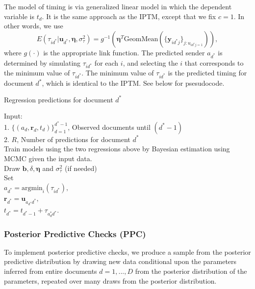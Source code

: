 \documentclass[twoside]{article}
\begin{document}
     The model of timing is via generalized linear model in which the dependent variable is $t_{d}$. It is the same approach as the IPTM, except that we fix $c=1$. In other words, we use
     \begin{equation*}
     E(\tau_{id^*}|\boldsymbol{u}_{d^*}, \boldsymbol{\eta}, \sigma_\tau^2) = g^{-1}(\boldsymbol{\eta}^T\mbox{GeomMean}(\{\boldsymbol{y}_{id^*j}\}_{j:u_{id^*j = 1}})),
     \label{eqn:predtime}
     \end{equation*}
     where $g(\cdot)$ is the appropriate link function. The predicted sender $a_{d^*}$ is determined by simulating $\tau_{id^*}$ for each $i$, and selecting the $i$ that corresponds to the minimum value of $\tau_{id^*}$. The minimum value of $\tau_{id^*}$ is the predicted timing for document $d^*$, which is identical to the IPTM. See below for psesudocode.
     \begin{algorithm}[H]
     	\footnotesize
     	\SetAlgoLined
     	\caption{Regression predictions for document $d^*$}
     	Input:\\
	1.  $\{(a_d, \boldsymbol{r}_d,t_d)\}_{d=1}^{d^*-1}$, Observed documents until $(d^*-1)$ \\
     2. $R$, Number of predictions for document $d^*$\\
     
     	Train models using the two regressions above by Bayesian estimation using MCMC given the input data. \\
     	 {
     		Draw $\boldsymbol{b}, \delta, \boldsymbol{\eta}$  and $\sigma_\tau^2$ (if needed)\\
     		Set\\$a_{d^*} = \mbox{argmin}_{i}(\tau_{id^*}),$ \\
     		$\boldsymbol{r}_{d^*} = \boldsymbol{u}_{a_{d^*}d^*},$\\
     		$t_{d^*}=t_{d^*-1} + \tau_{a_d^* d^*}$.
     	}
     	\label{alg:docpredict}
     \end{algorithm}
     \subsubsection{Posterior Predictive Checks (PPC)}\label{subsubsec:Details on PPC}  
     To implement posterior predictive checks, we produce a sample from the posterior predictive distribution by drawing new data conditional upon the parameters inferred from entire documents $d=1,...,D$ from the posterior distribution of the parameters, repeated over many draws from the posterior distribution. 
     
\end{document}

